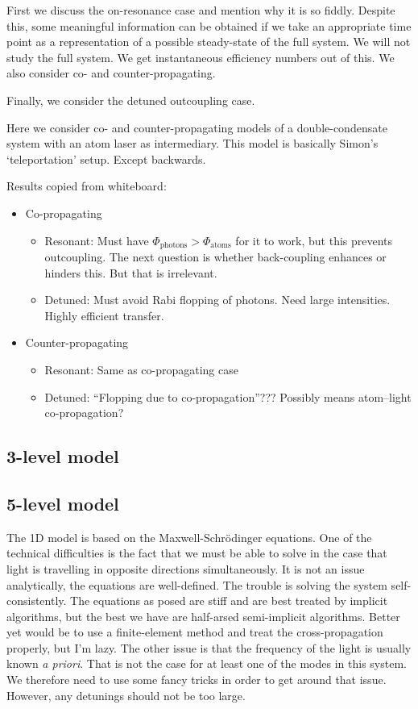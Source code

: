 First we discuss the on-resonance case and mention why it is so fiddly.  Despite this, some meaningful information can be obtained if we take an appropriate time point as a representation of a possible steady-state of the full system.  We will not study the full system.  We get instantaneous efficiency numbers out of this.  We also consider co- and counter-propagating.

Finally, we consider the detuned outcoupling case.

Here we consider co- and counter-propagating models of a double-condensate system with an atom laser as intermediary.  This model is basically Simon's `teleportation' setup. Except backwards.

Results copied from whiteboard:
\begin{itemize}
    \item Co-propagating
    \begin{itemize}
        \item Resonant: Must have $\Phi_\text{photons} > \Phi_\text{atoms}$ for it to work, but this prevents outcoupling.  The next question is whether back-coupling enhances or hinders this. But that is irrelevant.
        \item Detuned: Must avoid Rabi flopping of photons.  Need large intensities.  Highly efficient transfer.
    \end{itemize}
    \item Counter-propagating
    \begin{itemize}
        \item Resonant: Same as co-propagating case
        \item Detuned: ``Flopping due to co-propagation''??? Possibly means atom--light co-propagation?
    \end{itemize}
\end{itemize}


\subsection{3-level model}

\subsection{5-level model}
The 1D model is based on the Maxwell-Schrödinger equations.  One of the technical difficulties is the fact that we must be able to solve in the case that light is travelling in opposite directions simultaneously.  It is not an issue analytically, the equations are well-defined.  The trouble is solving the system self-consistently.  The equations as posed are stiff and are best treated by implicit algorithms, but the best we have are half-arsed semi-implicit algorithms. Better yet would be to use a finite-element method and treat the cross-propagation properly, but I'm lazy.  The other issue is that the frequency of the light is usually known \emph{a priori}.  That is not the case for at least one of the modes in this system.  We therefore need to use some fancy tricks in order to get around that issue.  However, any detunings should not be too large.


